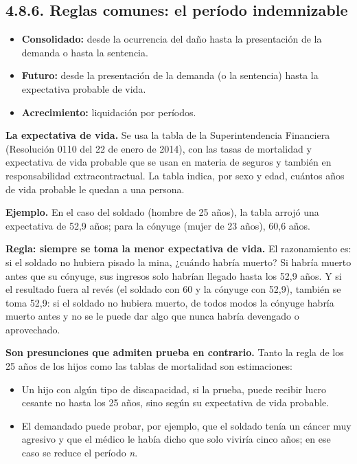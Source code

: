 \subsection{4.8.6. Reglas comunes: el período indemnizable}
\begin{itemize}
\item \textbf{Consolidado:} desde la ocurrencia del daño hasta la presentación de la demanda o hasta la sentencia.
\item \textbf{Futuro:} desde la presentación de la demanda (o la sentencia) hasta la expectativa probable de vida.
\item \textbf{Acrecimiento:} liquidación por períodos.
\end{itemize}
\textbf{La expectativa de vida.} Se usa la tabla de la Superintendencia Financiera (Resolución 0110 del 22 de enero de 2014), con las tasas de mortalidad y expectativa de vida probable que se usan en materia de seguros y también en responsabilidad extracontractual. La tabla indica, por sexo y edad, cuántos años de vida probable le quedan a una persona.

\begin{ejemplo}
\textcolor[HTML]{4F6228}{\textbf{Ejemplo. }}En el caso del soldado (hombre de 25 años), la tabla arrojó una expectativa de 52,9 años; para la cónyuge (mujer de 23 años), 60,6 años.
\end{ejemplo}
\textbf{Regla: siempre se toma la menor expectativa de vida.} El razonamiento es: si el soldado no hubiera pisado la mina, ¿cuándo habría muerto? Si habría muerto antes que su cónyuge, sus ingresos solo habrían llegado hasta los 52,9 años. Y si el resultado fuera al revés (el soldado con 60 y la cónyuge con 52,9), también se toma 52,9: si el soldado no hubiera muerto, de todos modos la cónyuge habría muerto antes y no se le puede dar algo que nunca habría devengado o aprovechado.

\textbf{Son presunciones que admiten prueba en contrario.} Tanto la regla de los 25 años de los hijos como las tablas de mortalidad son estimaciones:

\begin{itemize}
\item Un hijo con algún tipo de discapacidad, si la prueba, puede recibir lucro cesante no hasta los 25 años, sino según su expectativa de vida probable.
\item El demandado puede probar, por ejemplo, que el soldado tenía un cáncer muy agresivo y que el médico le había dicho que solo viviría cinco años; en ese caso se reduce el período \textit{n}.
\end{itemize}
